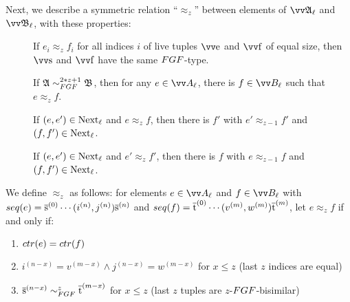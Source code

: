 Next, we describe a symmetric relation ``$\approx_{z}$'' between elements of $\unravel{A}_{\ell}$ and $\unravel{B}_{\ell}$, with these properties:
\begin{description}
  \item[] If $e_{i} \approx_{z} f_{i}$ for all indices $i$ of live tuples $\elemtuptuplee$ and $\elemtuptuplef$ of equal size, then $\elemtuptuples$ and $\elemtuptuplef$ have the same $\FGF$-type.
  \item[] If $\str{A} \bisimto_{\FGF}^{2*z + 1} \str{B}$, then for any $e \in \unraveldom{A}_{\ell}$, there is $f \in \unraveldom{B}_{\ell}$ such that $e \approx_{z} f$.
  \item[] If $(e, e') \in \mathrm{Next}_{\ell}$ and $e \approx_{z} f$, then there is $f'$ with $e' \approx_{z-1} f'$ and $(f, f') \in \mathrm{Next}_{\ell}$.
  \item[] If $(e, e') \in \mathrm{Next}_{\ell}$ and $e' \approx_{z} f'$, then there is $f$ with $e \approx_{z-1} f$ and $(f, f') \in \mathrm{Next}_{\ell}$.
\end{description}
We define $\approx_{z}$ as follows: for elements $e \in \unraveldom{A}_{\ell}$ and $f \in \unraveldom{B}_{\ell}$ with $\seq{e} = \elemtuples^{(0)}\cdots(i^{(n)}, j^{(n)})\elemtuples^{(n)}$ and $\seq{f} = \elemtuplet^{(0)}\cdots(v^{(m)}, w^{(m)})\elemtuplet^{(m)}$, let $e \approx_{z} f$ if and only if:
\begin{enumerate}
  \item $\ctr{e} = \ctr{f}$
  \item $i^{(n-x)} = v^{(m-x)} \wedge j^{(n-x)} = w^{(m-x)}$ for $x \le z$ (last $z$ indices are equal)
  \item $\elemtuples^{(n-x)} \bisimto_{\FGF}^{z} \elemtuplet^{(m-x)}$ for $x \le z$ (last $z$ tuples are $z$-$\FGF$-bisimilar)
\end{enumerate}
